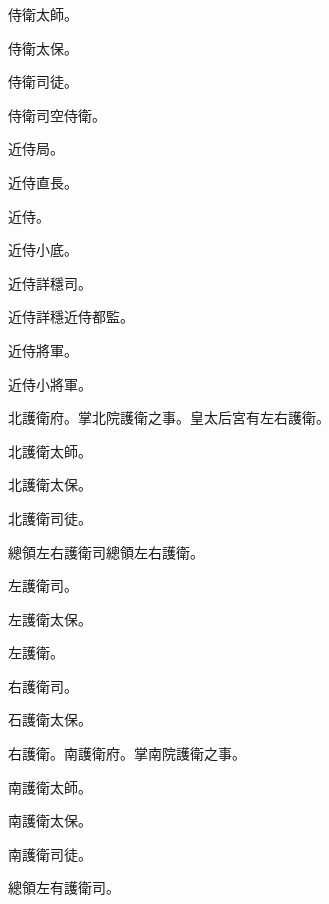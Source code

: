 \begin{pinyinscope}
 侍衛太師。



 侍衛太保。



 侍衛司徒。



 侍衛司空侍衛。



 近侍局。



 近侍直長。



 近侍。



 近侍小底。



 近侍詳穩司。



 近侍詳穩近侍都監。



 近侍將軍。



 近侍小將軍。



 北護衛府。掌北院護衛之事。皇太后宮有左右護衛。



 北護衛太師。



 北護衛太保。



 北護衛司徒。



 總領左右護衛司總領左右護衛。



 左護衛司。



 左護衛太保。



 左護衛。



 右護衛司。



 石護衛太保。



 右護衛。南護衛府。掌南院護衛之事。



 南護衛太師。



 南護衛太保。



 南護衛司徒。



 總領左有護衛司。




\end{pinyinscope}

